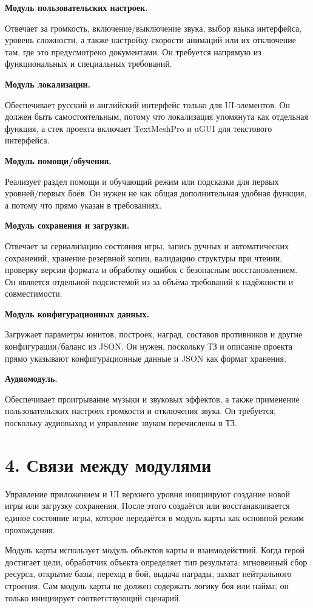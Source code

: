 \documentclass[12pt,a4paper]{article}
\begin{document}
\textbf{Модуль пользовательских настроек.}

Отвечает за громкость, включение/выключение звука, выбор языка интерфейса, уровень сложности, а также настройку скорости анимаций или их отключение там, где это предусмотрено документами. Он требуется напрямую из функциональных и специальных требований.

\textbf{Модуль локализации.}

Обеспечивает русский и английский интерфейс только для UI-элементов. Он должен быть самостоятельным, потому что локализация упомянута как отдельная функция, а стек проекта включает TextMeshPro и uGUI для текстового интерфейса.

\textbf{Модуль помощи/обучения.}

Реализует раздел помощи и обучающий режим или подсказки для первых уровней/первых боёв. Он нужен не как общая дополнительная удобная функция, а потому что прямо указан в требованиях.

\textbf{Модуль сохранения и загрузки.}

Отвечает за сериализацию состояния игры, запись ручных и автоматических сохранений, хранение резервной копии, валидацию структуры при чтении, проверку версии формата и обработку ошибок с безопасным восстановлением. Он является отдельной подсистемой из-за объёма требований к надёжности и совместимости.

\textbf{Модуль конфигурационных данных.}

Загружает параметры юнитов, построек, наград, составов противников и другие конфигурации/баланс из JSON. Он нужен, поскольку ТЗ и описание проекта прямо указывают конфигурационные данные и JSON как формат хранения.

\textbf{Аудиомодуль.}

Обеспечивает проигрывание музыки и звуковых эффектов, а также применение пользовательских настроек громкости и отключения звука. Он требуется, поскольку аудиовыход и управление звуком перечислены в ТЗ.

\section*{4. Связи между модулями}

Управление приложением и UI верхнего уровня инициируют создание новой игры или загрузку сохранения. После этого создаётся или восстанавливается единое состояние игры, которое передаётся в модуль карты как основной режим прохождения.

Модуль карты использует модуль объектов карты и взаимодействий. Когда герой достигает цели, обработчик объекта определяет тип результата: мгновенный сбор ресурса, открытие базы, переход в бой, выдача награды, захват нейтрального строения. Сам модуль карты не должен содержать логику боя или найма; он только инициирует соответствующий сценарий.
\end{document}
